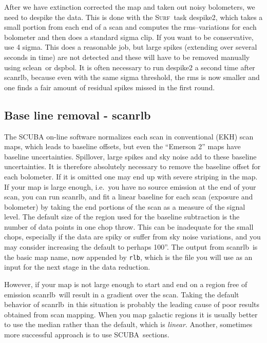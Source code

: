 \documentclass[twoside,11pt]{article}
\newcommand{\scuba}{\htmladdnormallink{SCUBA}{http://www.jach.hawaii.edu/JCMT/}}
\newcommand{\surf}{\xref{\textsc{Surf}}{sun216}{}}
\newcommand{\task}[1]{\textsf{#1}}
\newcommand{\desp}{\xref{\task{despike}}{sun216}{DESPIKE}}
\newcommand{\dspbol}{\xref{\task{dspbol}}{sun216}{DSPBOL}}
\newcommand{\scanrlb}{\xref{\task{scan\_rlb}}{sun216}{SCAN_RLB}}
\newcommand{\sclean}{\xref{\task{sclean}}{sun86}{SCLEAN}}
\newcommand{\htmladdnormallink}[2]{#1}
\newcommand{\xref}[3]{#1}
\newcommand{\xlabel}[1]{}
\renewcommand{\_}{\texttt{\symbol{95}}}
\begin{document}
After we have extinction corrected the map and taken out noisy
bolometers, we need to despike the data.  This is done with the \surf\
task \desp2, which takes a small portion from each end of a scan and
computes the rms--variations for each bolometer and then does a
standard sigma clip.  If you want to be conservative, use 4 sigma. 
This does a reasonable job, but large spikes (extending over several
seconds in time) are not detected and these will have to be removed
manually using \sclean\ or \dspbol.  It is often necessary to run
\desp2 a second time after \scanrlb, because even with the same sigma
threshold, the rms is now smaller and one finds a fair amount of
residual spikes missed in the first round.


\subsection{\xlabel{Base_line_removal}Base line removal - \scanrlb}

The SCUBA on-line software normalizes each scan in conventional (EKH)
scan maps, which leads to baseline offsets, but even the ``Emerson 2''
maps have baseline uncertainties.  Spillover, large spikes and sky
noise add to these baseline uncertainties.  It is therefore absolutely
necessary to remove the baseline offset for each bolometer.  If it is
omitted one may end up with severe striping in the map.  If your map
is large enough, i.e.\ you have no source emission at the end of your
scan, you can run \scanrlb, and fit a linear baseline for each scan
(exposure and bolometer) by taking the end portions of the scan as a
measure of the signal level.  The default size of the region used for
the baseline subtraction is the number of data points in one chop
throw.  This can be inadequate for the small chops, especially if the
data are spiky or suffer from sky noise variations, and you may
consider increasing the default to perhaps 100''.  The output from
\scanrlb\ is the basic map name, now appended by \texttt{\_rlb}, which
is the file you will use as an input for the next stage in the data
reduction.


However, if your map is not large enough to start and end on a region
free of emission \scanrlb\ will result in a gradient over the scan. 
Taking the default behavior of \scanrlb\ in this situation
is probably the leading cause of poor results obtained from scan
mapping.  When you map galactic regions it is usually better to use
the median rather than the default, which is \textit{linear}.  Another,
sometimes more successful approach is to use \scuba\ sections.
\end{document}
